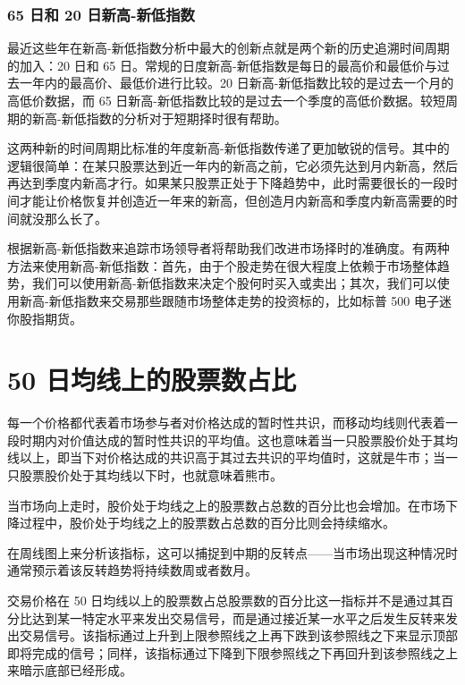 \subsubsection*{65 日和 20 日新高-新低指数}
最近这些年在新高-新低指数分析中最大的创新点就是两个新的历史追溯时间周期的加入：20 日和 65 日。常规的日度新高-新低指数是每日的最高价和最低价与过去一年内的最高价、最低价进行比较。20 日新高-新低指数比较的是过去一个月的高低价数据，而 65 日新高-新低指数比较的是过去一个季度的高低价数据。较短周期的新高-新低指数的分析对于短期择时很有帮助。

这两种新的时间周期比标准的年度新高-新低指数传递了更加敏锐的信号。其中的逻辑很简单：在某只股票达到近一年内的新高之前，它必须先达到月内新高，然后再达到季度内新高才行。如果某只股票正处于下降趋势中，此时需要很长的一段时间才能让价格恢复并创造近一年来的新高，但创造月内新高和季度内新高需要的时间就没那么长了。

根据新高-新低指数来追踪市场领导者将帮助我们改进市场择时的准确度。有两种方法来使用新高-新低指数：首先，由于个股走势在很大程度上依赖于市场整体趋势，我们可以使用新高-新低指数来决定个股何时买入或卖出；其次，我们可以使用新高-新低指数来交易那些跟随市场整体走势的投资标的，比如标普 500 电子迷你股指期货。
\section{50 日均线上的股票数占比}
每一个价格都代表着市场参与者对价格达成的暂时性共识，而移动均线则代表着一段时期内对价值达成的暂时性共识的平均值。这也意味着当一只股票股价处于其均线以上，即当下对价格达成的共识高于其过去共识的平均值时，这就是牛市；当一只股票股价处于其均线以下时，也就意味着熊市。

当市场向上走时，股价处于均线之上的股票数占总数的百分比也会增加。在市场下降过程中，股价处于均线之上的股票数占总数的百分比则会持续缩水。

在周线图上来分析该指标，这可以捕捉到中期的反转点——当市场出现这种情况时通常预示着该反转趋势将持续数周或者数月。
\begin{tcolorbox}
    交易价格在 50 日均线以上的股票数占总股票数的百分比这一指标并不是通过其百分比达到某一特定水平来发出交易信号，而是通过接近某一水平之后发生反转来发出交易信号。该指标通过上升到上限参照线之上再下跌到该参照线之下来显示顶部即将完成的信号；同样，该指标通过下降到下限参照线之下再回升到该参照线之上来暗示底部已经形成。
\end{tcolorbox}

